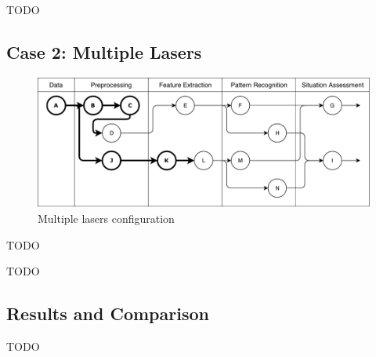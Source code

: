 TODO


\subsection{Case 2: Multiple Lasers}

\begin{figure}[ht!]
\centering
\includegraphics[scale=0.7]{fig/4/test_configuration2.pdf}
\caption{Multiple lasers configuration}
\label{tconf2}
\end{figure}

TODO

%

TODO

\subsection{Results and Comparison}

TODO